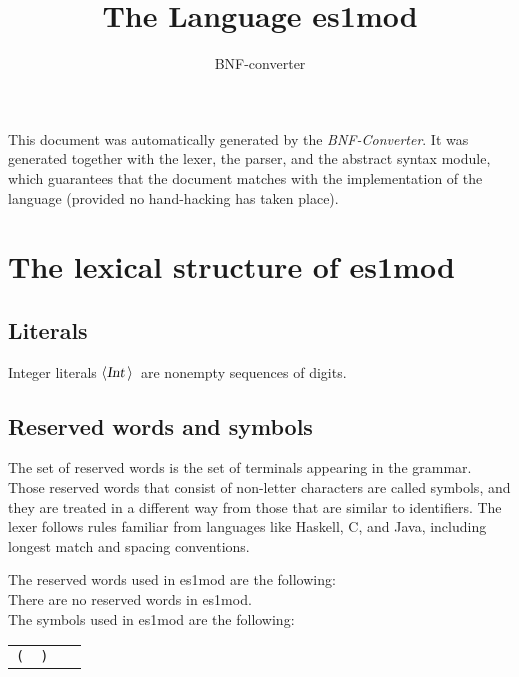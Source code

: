 \documentclass[a4paper,11pt]{article}
\author{BNF-converter}
\title{The Language es1mod}
\begin{document}
\maketitle

\newcommand{\emptyP}{\mbox{$\epsilon$}}
\newcommand{\terminal}[1]{\mbox{{\texttt {#1}}}}
\newcommand{\nonterminal}[1]{\mbox{$\langle \mbox{{\sl #1 }} \! \rangle$}}
\newcommand{\arrow}{\mbox{::=}}
\newcommand{\delimit}{\mbox{$|$}}
\newcommand{\reserved}[1]{\mbox{{\texttt {#1}}}}
\newcommand{\literal}[1]{\mbox{{\texttt {#1}}}}
\newcommand{\symb}[1]{\mbox{{\texttt {#1}}}}

This document was automatically generated by the {\em BNF-Converter}. It was generated together with the lexer, the parser, and the abstract syntax module, which guarantees that the document matches with the implementation of the language (provided no hand-hacking has taken place).

\section*{The lexical structure of es1mod}

\subsection*{Literals}
Integer literals \nonterminal{Int}\ are nonempty sequences of digits.




\subsection*{Reserved words and symbols}
The set of reserved words is the set of terminals appearing in the grammar. Those reserved words that consist of non-letter characters are called symbols, and they are treated in a different way from those that are similar to identifiers. The lexer follows rules familiar from languages like Haskell, C, and Java, including longest match and spacing conventions.

The reserved words used in es1mod are the following: \\

There are no reserved words in es1mod.\\

The symbols used in es1mod are the following: \\

\begin{tabular}{lll}
{\symb{(}} &{\symb{)}} &{\symb{ }} \\
\end{tabular}\\
\end{document}
